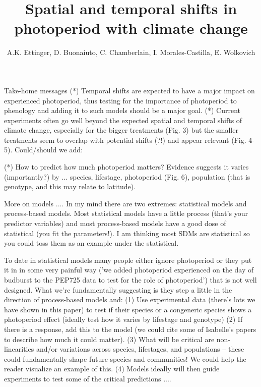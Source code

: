 \documentclass{article}
\begin{document}
 
\title{Spatial and temporal shifts in photoperiod with climate change} %

\author{A.K. Ettinger, D. Buonaiuto, C. Chamberlain, I. Morales-Castilla, E. Wolkovich}
\maketitle  %

\iffalse
Take-home messages 
(*) Temporal shifts are expected to have a major impact on experienced photoperiod, thus testing for the importance of photoperiod to phenology and adding it to such models should be a major goal.
(*) Current experiments often go well beyond the expected spatial and temporal shifts of climate change, especially for the bigger treatments (Fig. 3) but  the smaller treatments seem to overlap with potential shifts (?!) and appear relevant (Fig. 4-5). 
Could/should we add: 

(*) How to predict how much photoperiod matters? Evidence suggests it varies (importantly?) by ... species, lifestage, photoperiod (Fig. 6), population (that is genotype, and this may relate to latitude). 

More on models ....
In my mind there are two extremes: statistical models and process-based models. Most statistical models have a little process (that's your predictor variables) and most process-based models have a good dose of statistical (you fit the parameters!). I am thinking most SDMs are statistical so you could toss them as an example under the statistical.

To date in statistical models many people either ignore photoperiod or they put it in in some very painful way ('we added photoperiod experienced on the day of budburst to the PEP725 data to test for the role of photoperiod') that is not well designed. What we're fundamentally suggesting is they step a little in the direction of process-based models and:
(1) Use experimental data (there's lots we have shown in this paper) to test if their species or a congeneric species shows a photoperiod effect (ideally test how it varies by lifestage and genotype)
(2) If there is a response, add this to the model (we could cite some of Isabelle's papers to describe how much it could matter).
(3) What will be critical are non-linearities and/or variations across species, lifestages, and populations -- these could fundamentally shape future species and communities! We could help the reader visualize an example of this.
(4) Models ideally will then guide experiments to test some of the critical predictions ....
	
\end{document}
